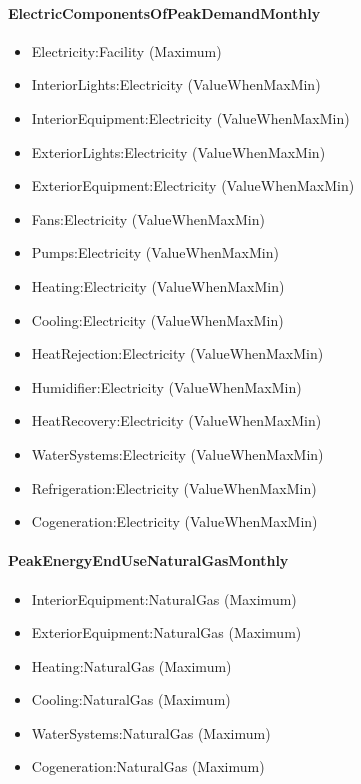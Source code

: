 \paragraph{ElectricComponentsOfPeakDemandMonthly}\label{electriccomponentsofpeakdemandmonthly}

\begin{itemize}
\item
  Electricity:Facility (Maximum)
\item
  InteriorLights:Electricity (ValueWhenMaxMin)
\item
  InteriorEquipment:Electricity (ValueWhenMaxMin)
\item
  ExteriorLights:Electricity (ValueWhenMaxMin)
\item
  ExteriorEquipment:Electricity (ValueWhenMaxMin)
\item
  Fans:Electricity (ValueWhenMaxMin)
\item
  Pumps:Electricity (ValueWhenMaxMin)
\item
  Heating:Electricity (ValueWhenMaxMin)
\item
  Cooling:Electricity (ValueWhenMaxMin)
\item
  HeatRejection:Electricity (ValueWhenMaxMin)
\item
  Humidifier:Electricity (ValueWhenMaxMin)
\item
  HeatRecovery:Electricity (ValueWhenMaxMin)
\item
  WaterSystems:Electricity (ValueWhenMaxMin)
\item
  Refrigeration:Electricity (ValueWhenMaxMin)
\item
  Cogeneration:Electricity (ValueWhenMaxMin)
\end{itemize}

\paragraph{PeakEnergyEndUseNaturalGasMonthly}\label{peakenergyendusenaturalgasmonthly}

\begin{itemize}
\item
  InteriorEquipment:NaturalGas (Maximum)
\item
  ExteriorEquipment:NaturalGas (Maximum)
\item
  Heating:NaturalGas (Maximum)
\item
  Cooling:NaturalGas (Maximum)
\item
  WaterSystems:NaturalGas (Maximum)
\item
  Cogeneration:NaturalGas (Maximum)
\end{itemize}


